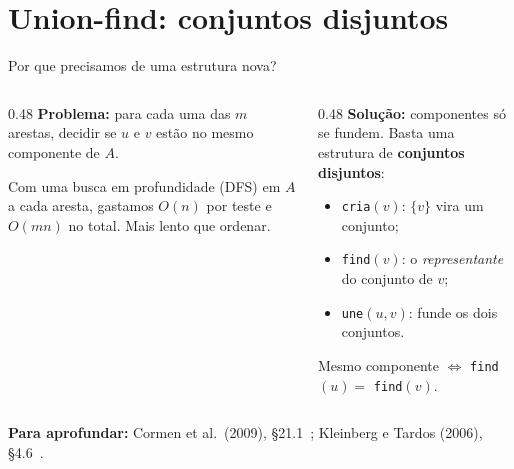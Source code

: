 \documentclass[aspectratio=169,xcolor=table]{beamer}
\newcommand{\fonte}[1]{%
  \vfill
  {\tiny\color{gray!55!black}\textbf{Para aprofundar:} #1\par}%
}
\begin{document}
\section{Union-find: conjuntos disjuntos}

\begin{frame}{Por que precisamos de uma estrutura nova?}
  \begin{columns}[T]
    \begin{column}{0.48\textwidth}
      \textbf{Problema:} para cada uma das $m$ arestas, decidir se $u$ e $v$ estão no mesmo
      componente de $A$.
      \medskip

      {\small Com uma busca em profundidade (DFS) em $A$ a cada aresta, gastamos $O(n)$ por
      teste e $O(mn)$ no total. Mais lento que ordenar.}
    \end{column}
    \begin{column}{0.48\textwidth}
      \textbf{Solução:} componentes só se fundem. Basta uma estrutura de
      \textbf{conjuntos disjuntos}:
      \begin{itemize}
        \small
        \item \texttt{cria}$(v)$: $\{v\}$ vira um conjunto;
        \item \texttt{find}$(v)$: o \emph{representante} do conjunto de $v$;
        \item \texttt{une}$(u,v)$: funde os dois conjuntos.
      \end{itemize}
      {\small Mesmo componente $\iff$ \texttt{find}$(u) =$ \texttt{find}$(v)$.}
    \end{column}
  \end{columns}
  \fonte{Cormen et al.\ (2009), \S 21.1~\cite{cormen2009introduction};
    Kleinberg e Tardos (2006), \S 4.6~\cite{kleinberg2006algorithm}.}
\end{frame}
\end{document}

